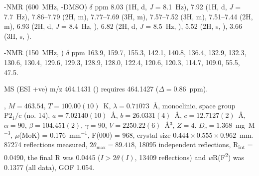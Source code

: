 \begin{refsection}

-NMR (600~MHz, -DMSO) $\delta$ ppm 
8.03 (1H, d, \textit{J} = 8.1~Hz), 
7.92 (1H, d, \textit{J} = 7.7~Hz), 
7.86--7.79 (2H, m), 
7.77--7.69 (3H, m), 
7.57--7.52 (3H, m), 
7.51--7.44 (2H, m), 
6.93 (2H, d, \textit{J} = 8.4~Hz, ), 
6.82 (2H, d, \textit{J} = 8.5~Hz, ), 
5.52 (2H, s, ), 
3.66 (3H, s, ).

-NMR (150~MHz, ) $\delta$ ppm 163.9, 159.7, 155.3, 142.1, 140.8, 136.4, 132.9, 132.3, 130.6, 130.4, 129.6, 129.3, 128.9, 128.0, 122.4, 120.6, 120.3, 114.7, 109.0, 55.5, 47.5.

MS (ESI +ve) m/z 464.1431 ()  requires 464.1427 ($\Delta=0.86$~ppm).


, $M=463.54$, $T=100.00(10)$~K, $\lambda=0.71073$~\AA, monoclinic, space group $\text{P}2_1/\text{c}$ (no. 14), $a = 7.02140(10)$~\AA, $b = 26.0331(4)$~\AA, $c = 12.7127(2)$~\AA, $\alpha = 90$\degree, $\beta = 104.451(2)$\degree, $\gamma = 90$\degree, $V = 2250.22(6)$~\AA$^{3}$, $Z = 4$. $D_{c}= 1.368$~mg~M$^{-3}$, $\mu$(MoK\a) = 0.176~mm$^{-1}$, F(000) = 968, crystal size $0.444 \times 0.555 \times 0.962$~mm. 87274 reflections measured, $2\theta_{\max}=89.418$\degree, 18095 independent reflections, R\textsubscript{int} = 0.0490, the final R was 0.0445 ($I > 2\theta(I)$, 13409 reflections) and \emph{w}R(F\textsuperscript{2}) was 0.1377 (all data), GOF 1.054. 


\end{refsection}
